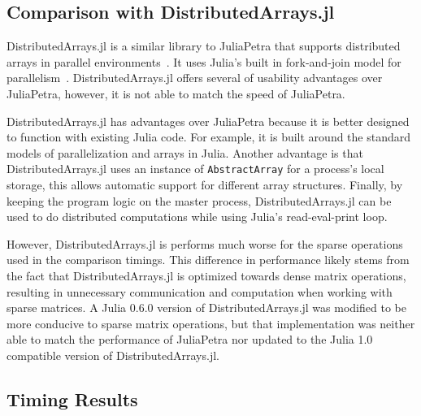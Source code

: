 \documentclass[acmsmall]{acmart}
\newcommand{\snippet}[1]{\lstinline{#1}}
\begin{document}
	\subsection{Comparison with DistributedArrays.jl}
	
	DistributedArrays.jl is a similar library to JuliaPetra that supports
	distributed arrays in parallel environments~\cite{Github:DA}.
	It uses Julia's built in fork-and-join model for parallelism~\cite{Bezanson:2017:FreshApproach}.
	DistributedArrays.jl offers several of usability advantages over JuliaPetra, however, it is not able to match the speed of JuliaPetra.
	
	DistributedArrays.jl has advantages over JuliaPetra because it is better designed to function with
	existing Julia code.
	For example, it is built around the standard models of parallelization and arrays in Julia.
	Another advantage is that DistributedArrays.jl uses an instance of \snippet{AbstractArray}
	for a process's local storage, this allows automatic support for different array structures.
	Finally, by keeping the program logic on the master process, DistributedArrays.jl can be used to
	do distributed computations while using Julia's read-eval-print loop.
	
	However, DistributedArrays.jl is performs much worse for the sparse operations used in the comparison timings.
	This difference in performance likely stems from the fact that DistributedArrays.jl is optimized towards dense matrix operations, resulting in unnecessary communication and computation when working with sparse matrices.
	A Julia 0.6.0 version of DistributedArrays.jl was modified to be more conducive to sparse matrix operations, but that implementation was neither able to match the performance of JuliaPetra nor updated to the Julia 1.0 compatible version of DistributedArrays.jl.
	
	\subsection{Timing Results}
	
\end{document}
